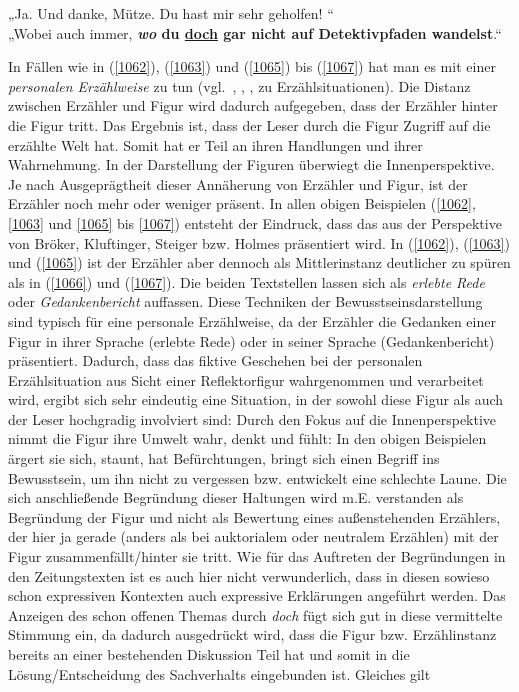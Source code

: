 \begin{exe}
	\ex\label{1069} 

	„Ja. Und danke, Mütze. Du hast mir sehr geholfen! “\\
	„Wobei auch immer, \textbf{\textit{wo} du \ul{doch} gar nicht auf Detektivpfaden wandelst}.“
	\newline\hbox{}\hfill\hbox{\citet[56]{Glauche2014}}
\end{exe}
In Fällen wie in (\ref{1062}), (\ref{1063}) und (\ref{1065}) bis (\ref{1067}) hat man es mit einer \textit{personalen Erzählweise} zu tun (vgl.\ \citealt[89--102]{Eicher2001}, \citealt[264--283]{Spoerl2004}, \citealt[49--50]{Klarer2009}, \citealt[114--119]{Nuenning2015} zu Erzählsi\-tuationen). Die Distanz zwischen Erzähler und Figur wird dadurch aufgegeben, dass der Erzähler hinter die Figur tritt. Das Ergebnis ist, dass der Leser durch die Figur Zugriff auf die erzählte Welt hat. Somit hat er Teil an ihren Handlungen und ihrer Wahrnehmung. In der Darstellung der Figuren überwiegt die Innen\-perspektive. Je nach Ausgeprägtheit dieser Annäherung von Erzähler und Figur, ist der Erzähler noch mehr oder weniger präsent. In allen obigen Beispielen (\ref{1062}, \ref{1063} und \ref{1065} bis \ref{1067}) entsteht der Eindruck, dass das  aus der Perspektive von Bröker, Kluftinger, Steiger bzw. Holmes präsentiert wird. In (\ref{1062}), (\ref{1063}) und (\ref{1065}) ist der Erzähler aber dennoch als Mittlerinstanz deutlicher zu spüren als in (\ref{1066}) und (\ref{1067}). Die beiden Textstellen lassen sich als \textit{erlebte Rede} oder \textit{Gedankenbericht}  auffassen. Diese Techniken der Bewusstseinsdarstellung sind typisch für eine personale Erzählweise, da der Erzähler die Gedanken einer Figur in ihrer Sprache (erlebte Rede) oder in seiner Sprache (Gedankenbericht) präsentiert. Dadurch, dass das fiktive Geschehen bei der personalen Erzählsituation aus Sicht einer Reflektorfigur  wahrgenommen und verarbeitet wird, ergibt sich sehr eindeutig eine Situation, in der sowohl diese Figur als auch der Leser hochgradig involviert sind: Durch den Fokus auf die Innenperspektive nimmt die Figur ihre Umwelt wahr, denkt und fühlt: In den obigen Beispielen ärgert sie sich, staunt, hat Befürchtungen, bringt sich einen Begriff ins Bewusstsein, um ihn nicht zu vergessen bzw. entwickelt eine schlechte Laune. Die sich anschließende Begründung dieser Haltungen wird m.E. verstanden als Begründung der Figur und nicht als Bewertung eines außenstehenden Erzählers, der hier ja gerade (anders als bei auktorialem  oder  neutralem Erzählen) mit der Figur zusammenfällt/hinter sie tritt. Wie für das Auftreten der Begründungen in den Zeitungstexten ist es auch hier nicht verwunderlich, dass in diesen sowieso schon expressiven Kontexten auch expressive Erklärungen angeführt werden. Das Anzeigen des schon offenen Themas durch \textit{doch} fügt sich gut in diese vermittelte Stimmung ein, da dadurch ausgedrückt wird, dass die Figur bzw. Erzählinstanz bereits an einer bestehenden Diskussion Teil hat und somit in die Lösung/Entscheidung des Sachverhalts eingebunden ist. Gleiches gilt 